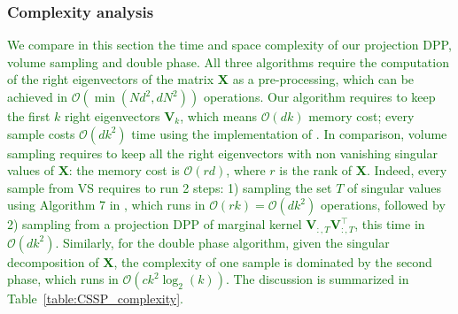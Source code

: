 \documentclass[twoside,11pt]{book}
\newcommand{\rev}[1]{\textcolor{darkgreen}{#1}}
\DeclareMathOperator{\Tran}{\intercal}
\begin{document}
\subsubsection{Complexity analysis}\label{sec:complexity}
\rev{We compare in this section the time and space complexity of our projection DPP, volume sampling and double phase.
All three algorithms require the computation of the right eigenvectors of the matrix $\bm{X}$ as a pre-processing, which can be achieved in $\mathcal{O}(\min(N d^{2},dN^{2}))$ operations.
Our algorithm requires to keep the first $k$ right eigenvectors $\bm{V}_{k}$, which means $\mathcal{O}(dk)$ memory cost; every sample costs $\mathcal{O}(dk^{2})$ time using the implementation of \cite{TrBaAm18}.}
\rev{In comparison, volume sampling requires to keep all the right eigenvectors with non vanishing singular values of $\bm{X}$: the memory cost is $\mathcal{O}(r d)$, where $r$ is the rank of $\bm{X}$.
Indeed, every sample from VS requires to run 2 steps: 1) sampling the set $T$ of singular values using Algorithm 7 in \citep{KuTa12}, which runs in $\mathcal{O}(rk) = \mathcal{O}(dk^{2})$ operations, followed by 2) sampling from a projection DPP of marginal kernel $\bm{V}_{:,T}^{\phantom{\Tran}}\bm{V}_{:,T}^{\Tran}$, this time in $\mathcal{O}(dk^{2})$.
%
Similarly, for the double phase algorithm, given the singular decomposition of $\bm{X}$, the complexity of one sample is dominated by the second phase, which runs in $\mathcal{O}(c k^{2} \log_{2}(k))$. The discussion is summarized in Table~\ref{table:CSSP_complexity}.}
\end{document}
